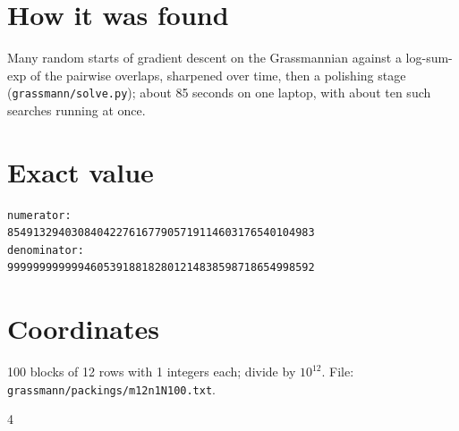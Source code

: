 \documentclass[11pt,a4paper]{article}
\begin{document}
\section{How it was found}
Many random starts of gradient descent on the Grassmannian against a log-sum-exp of the pairwise overlaps, sharpened over time, then a polishing stage (\texttt{grassmann/solve.py}); about 85 seconds on one laptop, with about ten such searches running at once.


\appendix
\section{Exact value}
{\small
\begin{verbatim}
numerator:
854913294030840422761677905719114603176540104983
denominator:
999999999999460539188182801214838598718654998592
\end{verbatim}}

\section{Coordinates}
100 blocks of 12 rows with 1 integers each; divide by $10^{12}$. File: \texttt{grassmann/packings/m12n1N100.txt}.
{\tiny
\begin{multicols}{4}
\end{multicols}}
\end{document}
